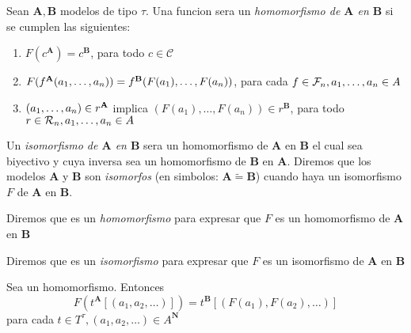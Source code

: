 \begin{definition}
  Sean $\mathbf{A}, \mathbf{B}$ modelos de tipo $\tau$. Una funcion  sera un \emph{homomorfismo de $\mathbf{A}$ en $\mathbf{B}$}
  si se cumplen las siguientes: \begin{enumerate}
    \item $F(c^\mathbf{A}) = c^\mathbf{B}$, para todo $c \in \mathcal{C}$
    \item $F(f^\mathbf{A}(a_{1}, \dots, a_{n})) = f^\mathbf{B}(F(a_1), \dots, F(a_n))$, para cada $f \in \mathcal{F}_n, a_{1}, \dots, a_{n} \in A$
    \item $(a_{1}, \dots, a_{n}) \in r^\mathbf{A}$ implica $(F(a_1), \dots, F(a_n)) \in r^\mathbf{B}$, para todo $r \in \mathcal{R}_n, a_{1}, \dots, a_{n}\in A$
  \end{enumerate}

  Un \emph{isomorfismo de $\mathbf{A}$ en $\mathbf{B}$} sera un homomorfismo de $\mathbf{A}$ en $\mathbf{B}$ el cual sea biyectivo y cuya inversa
  sea un homomorfismo de $\mathbf{B}$ en $\mathbf{A}$. Diremos que los modelos $\mathbf{A}$ y $\mathbf{B}$ son \emph{isomorfos} (en simbolos: $\mathbf{A} \tilde{=} \mathbf{B}$) 
  cuando haya un isomorfismo $F$ de $\mathbf{A}$ en $\mathbf{B}$.

  Diremos que  es un \emph{homomorfismo} para expresar que $F$ es un homomorfismo de $\mathbf{A}$ en $\mathbf{B}$

  Diremos que  es un \emph{isomorfismo} para expresar que $F$ es un isomorfismo de $\mathbf{A}$ en $\mathbf{B}$
\end{definition}

\begin{lemma}
  Sea  un homomorfismo. Entonces
  $$
  F(t^\mathbf{A}[(a_1, a_2, \dots)]) = t^\mathbf{B}[(F(a_1), F(a_2), \dots)]
  $$
  para cada $t \in T^\tau, (a_1, a_2, \dots) \in A^\mathbf{N}$
\end{lemma}

